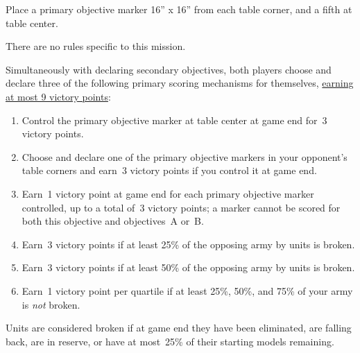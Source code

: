 

\begin{tablesetup}    
  \dawnofwar

  \smallskip Place a primary objective marker 16'' x 16'' from each
  table corner, and a fifth at table center.
\end{tablesetup}

\begin{missionrules}

\bigskip
There are no rules specific to this mission.
\end{missionrules}


\begin{scoring}
  
\begin{primaries}
  Simultaneously with declaring secondary objectives, both players
  choose and declare three of the following primary scoring mechanisms
  for themselves, \underline{earning at most 9 victory points}:

  \begin{enumerate}[label=\Alph*.]\shortlist
  \item Control the primary objective marker at table center at game
    end for~3 victory points.

  \item Choose and declare one of the primary objective markers in
    your opponent's table corners and earn~3 victory points if you
    control it at game end.

  \item Earn~1 victory point at game end for each primary objective
    marker controlled, up to a total of~3 victory points; a marker
    cannot be scored for both this objective and objectives~A or~B.

  \item Earn~3 victory points if at least 25\% of the opposing army by
    units is broken.

  \item Earn~3 victory points if at least 50\% of the opposing army by
    units is broken.

  \item Earn~1 victory point per quartile if at least 25\%, 50\%, and
    75\% of your army is \emph{not} broken.
  \end{enumerate}

  Units are considered broken if at game end they have been
  eliminated, are falling back, are in reserve, or have at most~25\%
  of their starting models remaining.
\end{primaries}

\end{scoring}
